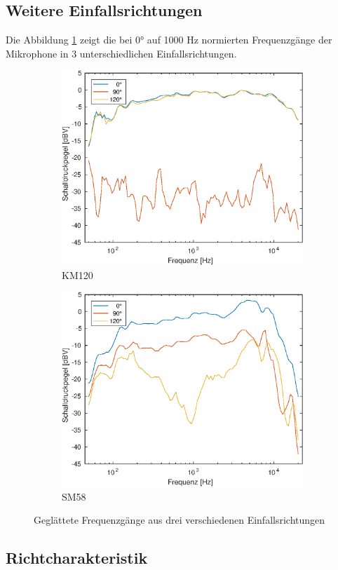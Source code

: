 \subsection{Weitere Einfallsrichtungen}

Die Abbildung \ref{fig:freq_all} zeigt die bei 0° auf 1000 Hz normierten Frequenzgänge der Mikrophone in 3 unterschiedlichen Einfallsrichtungen.

\begin{figure}[b]
    \centering
    \begin{subfigure}{.5\textwidth}
        \centering
        \caption{KM120}
        \includegraphics[width=0.95\linewidth]{Figures/km120_all}
    \end{subfigure}%
    \begin{subfigure}{.5\textwidth}
        \centering
        \caption{SM58}
        \includegraphics[width=0.95\linewidth]{Figures/sm58_all.eps}
    \end{subfigure}
    \caption{Geglättete Frequenzgänge aus drei verschiedenen Einfallsrichtungen}
    \label{fig:freq_all}
\end{figure}


\subsection{Richtcharakteristik}
